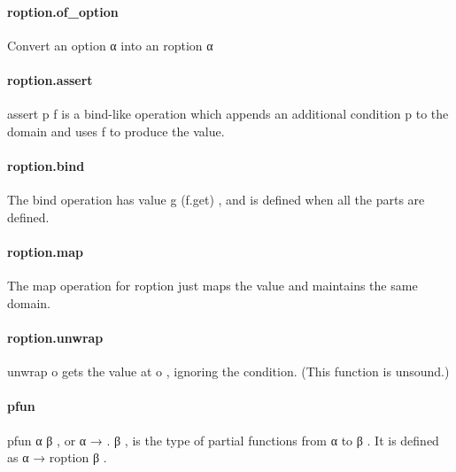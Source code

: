 \documentclass{article}
\begin{document}
\paragraph{roption.of\_option}
\par
Convert an 
\colorbox[RGB]{253,246,227}{{{{\color[RGB]{101, 123, 131} option α }}}} into an 
\colorbox[RGB]{253,246,227}{{{{\color[RGB]{101, 123, 131} roption α }}}}\paragraph{roption.assert}
\par
\colorbox[RGB]{253,246,227}{{{{\color[RGB]{133, 153, 0} assert }}}{{{\color[RGB]{101, 123, 131}  p f }}}} is a bind-like operation which appends an additional condition
\colorbox[RGB]{253,246,227}{{{{\color[RGB]{101, 123, 131} p }}}} to the domain and uses 
\colorbox[RGB]{253,246,227}{{{{\color[RGB]{101, 123, 131} f }}}} to produce the value.
\paragraph{roption.bind}
\par
The bind operation has value 
\colorbox[RGB]{253,246,227}{{{{\color[RGB]{101, 123, 131} g (f.get) }}}}, and is defined when all the
parts are defined.
\paragraph{roption.map}
\par
The map operation for 
\colorbox[RGB]{253,246,227}{{{{\color[RGB]{101, 123, 131} roption }}}} just maps the value and maintains the same domain.
\paragraph{roption.unwrap}
\par
\colorbox[RGB]{253,246,227}{{{{\color[RGB]{101, 123, 131} unwrap o }}}} gets the value at 
\colorbox[RGB]{253,246,227}{{{{\color[RGB]{101, 123, 131} o }}}}, ignoring the condition.
(This function is unsound.)
\paragraph{pfun}
\par
\colorbox[RGB]{253,246,227}{{{{\color[RGB]{101, 123, 131} pfun α β }}}}, or 
\colorbox[RGB]{253,246,227}{{{{\color[RGB]{101, 123, 131} α  }}}{{{\color[RGB]{133, 153, 0} → }}}{{{\color[RGB]{101, 123, 131} . β }}}}, is the type of partial functions from
\colorbox[RGB]{253,246,227}{{{{\color[RGB]{101, 123, 131} α }}}} to 
\colorbox[RGB]{253,246,227}{{{{\color[RGB]{101, 123, 131} β }}}}. It is defined as 
\colorbox[RGB]{253,246,227}{{{{\color[RGB]{101, 123, 131} α  }}}{{{\color[RGB]{133, 153, 0} → }}}{{{\color[RGB]{101, 123, 131}  roption β }}}}.
\end{document}

